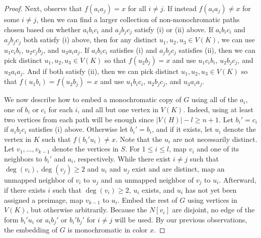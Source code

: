 \documentclass[10pt,a4paper]{amsart}
\newcommand\abs[1]{\left\lvert #1 \right\rvert}
\begin{document}
\begin{proof}
    Next, observe that $f(a_ia_j)=x$ for all $i\neq j$. If instead $f(a_ia_j)\neq x$ for some $i\neq j$, then we can find a larger collection of non-monochromatic paths chosen based on whether $a_ib_ic_i$ and $a_jb_jc_j$ satisfy (i) or (ii) above. If $a_ib_ic_i$ and $a_jb_jc_j$ both satisfy (i) above, then for any distinct $u_1,u_2,u_3\in V(K)$, we can use $u_1c_ib_i$, $u_2c_jb_j$, and  $u_3a_ia_j$. If $a_ib_ic_i$ satisfies (i) and $a_jb_jc_j$ satisfies (ii), then we can pick distinct $u_1,u_2,u_3\in V(K)$ so that $f(u_2b_j)=x$ and use $u_1c_ib_i$, $u_2b_jc_j$, and $u_3a_ia_j$. And if both satisfy (ii), then we can pick distinct $u_1,u_2,u_3\in V(K)$ so that $f(u_1b_i)=f(u_2b_j)=x$ and use $u_1b_ic_i$, $u_2b_jc_j$, and $u_3a_ia_j$.
    
    We now describe how to embed a monochromatic copy of $G$ using all of the $a_i$, one of $b_i$ or $c_i$ for each $i$, and all but one vertex in $V(K)$. Indeed, using at least two vertices from each path will be enough since $\abs{V(H)}-l\geq n+1$. Let $b_i'=c_i$ if $a_ib_ic_i$ satisfies (i) above. Otherwise let $b_i'=b_i$, and if it exists, let $u_i$ denote the vertex in $K$ such that $f(b_i'u_i)\neq x$. Note that the $u_i$ are not necessarily distinct. Let $v_1,\ldots,v_{k-1}$ denote the vertices in $S$. For $1\leq i\leq l$, map $v_i$ and one of its neighbors to $b_i'$ and $a_i$, respectively. While there exist $i\neq j$ such that $\deg(v_i),\deg(v_j)\geq 2$ and $u_i$ and $u_j$ exist and are distinct, map an unmapped neighbor of $v_i$ to $u_j$ and an unmapped neighbor of $v_j$ to $u_i$. Afterward, if there exists $i$ such that $\deg(v_i)\geq 2$, $u_i$ exists, and $u_i$ has not yet been assigned a preimage, map $v_{k-1}$ to $u_i$. Embed the rest of $G$ using vertices in $V(K)$, but otherwise arbitrarily. Because the $N[v_i]$ are disjoint, no edge of the form $b_i'u_i$ or $a_ib_j'$ or $b_i'b_j'$ for $i\neq j$ will be used. By our previous observations, the embedding of $G$ is monochromatic in color $x$.
\end{proof}
\end{document}
